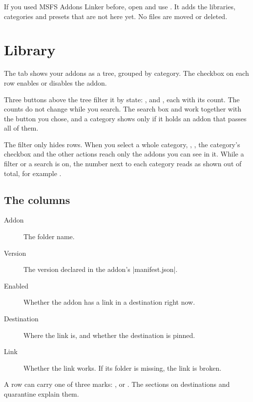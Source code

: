 \documentclass[11pt,a4paper]{article}
\begin{document}
If you used MSFS Addons Linker before, open  and use
. It adds the libraries, categories and
presets that are not here yet. No files are moved or deleted.

\section{Library}

The  tab shows your addons as a tree, grouped by category. The
checkbox on each row enables or disables the addon.


Three buttons above the tree filter it by state: ,  and
, each with its count. The counts do not change while you search.
The search box and  work together with the button you
chose, and a category shows only if it holds an addon that passes all of them.

The filter only hides rows. When you select a whole category, , , the category's checkbox and the other actions
reach only the addons you can see in it. While a filter or a search is on, the
number next to each category reads as shown out of total, for example
.

\subsection{The columns}

\begin{description}
  \item[Addon] The folder name.
  \item[Version] The version declared in the addon's \where|manifest.json|.
  \item[Enabled] Whether the addon has a link in a destination right now.
  \item[Destination] Where the link is, and whether the destination is pinned.
  \item[Link] Whether the link works. If its folder is missing, the link is
    broken.
\end{description}

A row can carry one of three marks: ,  or
. The sections on destinations and quarantine explain them.
\end{document}
